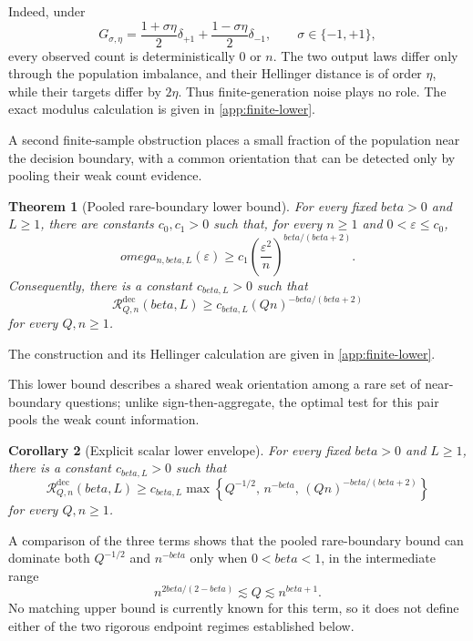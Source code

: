 \documentclass[11pt]{article}
\def\beta{beta}%
\def\omega{omega}%
\newtheorem{theorem}{Theorem}[section]
\newtheorem{corollary}[theorem]{Corollary}
\newcommand{\calR}{\mathcal R}
\newcommand{\eps}{\varepsilon}
\newcommand\eed[1]{{\color{green!45!black} #1}}
\begin{document}
Indeed, under
\[
G_{\sigma,\eta}
=
\frac{1+\sigma\eta}{2}\delta_{+1}
+
\frac{1-\sigma\eta}{2}\delta_{-1},
\qquad \sigma\in\{-1,+1\},
\]
every observed count is deterministically $0$ or $n$.  The two output laws differ only through the population imbalance, and their Hellinger distance is of order $\eta$, while their targets differ by $2\eta$.  Thus finite-generation noise plays no role.  The exact modulus calculation is given in \cref{app:finite-lower}.

\eed{A second finite-sample obstruction places a small fraction of the population near the decision boundary, with a common orientation that can be detected only by pooling their weak count evidence.}

\begin{theorem}[Pooled rare-boundary lower bound]
\label{thm:pooled-lower}
For every fixed $\beta>0$ and $L\ge1$, there are constants $c_0,c_1>0$ such that, for every $n\ge1$ and $0<\eps\le c_0$,
\begin{equation}
\label{eq:pooled-modulus-lower}
\omega_{n,\beta,L}(\eps)
\ge
c_1\left(\frac{\eps^2}{n}\right)^{\beta/(\beta+2)}.
\end{equation}
Consequently, there is a constant $c_{\beta,L}>0$ such that
\begin{equation}
\label{eq:pooled-lower}
\calR^{\mathrm{dec}}_{Q,n}(\beta,L)
\ge
c_{\beta,L}(Qn)^{-\beta/(\beta+2)}
\end{equation}
for every $Q,n\ge1$.
\end{theorem}
The construction and its Hellinger calculation are given in \cref{app:finite-lower}.

This lower bound describes a shared weak orientation among a rare set of near-boundary questions; unlike sign-then-aggregate, the optimal test for this pair pools the weak count information.

\begin{corollary}[Explicit scalar lower envelope]
\label{cor:explicit-lower-envelope}
For every fixed $\beta>0$ and $L\ge1$, there is a constant $c_{\beta,L}>0$ such that
\begin{equation}
\label{eq:explicit-lower-envelope}
\calR^{\mathrm{dec}}_{Q,n}(\beta,L)
\ge
c_{\beta,L}
\max\left\{
Q^{-1/2},\,
n^{-\beta},\,
(Qn)^{-\beta/(\beta+2)}
\right\}
\end{equation}
for every $Q,n\ge1$.
\end{corollary}

A comparison of the three terms shows that the pooled rare-boundary bound can dominate both $Q^{-1/2}$ and $n^{-\beta}$ only when $0<\beta<1$, in the intermediate range
\[
n^{2\beta/(2-\beta)}
\lesssim Q
\lesssim n^{\beta+1}.
\]
No matching upper bound is currently known for this term, so it does not define either of the two rigorous endpoint regimes established below.
\end{document}
